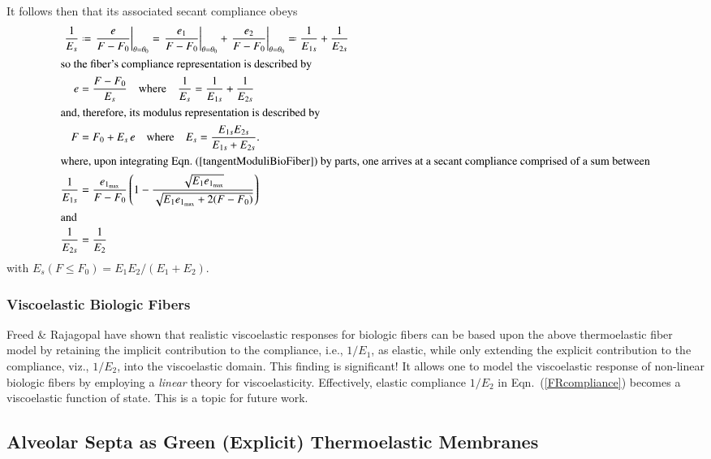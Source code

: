 It follows then that its associated secant compliance obeys
\begin{subequations}
    \label{secantFiberModulus}
    \begin{align}
    \frac{1}{E_s} & \defeq 
    \left. \frac{e}{F-F_0} \right|_{\theta = \theta_0} = 
    \left. \frac{e_1}{F-F_0} \right|_{\theta = \theta_0} + 
    \left. \frac{e_2}{F-F_0} \right|_{\theta = \theta_0} \eqdef 
    \frac{1}{E_{1s}} + \frac{1}{E_{2s}} \\
    \intertext{so the fiber's compliance representation is described by}
    e & = \frac{F - F_0}{E_s} 
    \quad \text{where} \quad
    \frac{1}{E_s} = \frac{1}{E_{1s}} + \frac{1}{E_{2s}} \\
    \intertext{and, therefore, its modulus representation is described by}
    F & = F_0 + E_s \, e
    \quad \text{where} \quad
    E_s = \frac{E_{1s} E_{2s}}{E_{1s} + E_{2s}} . \\
    \intertext{where, upon integrating Eqn.~(\ref{tangentModuliBioFiber}) by parts, one arrives at a secant compliance comprised of a sum between}
    \frac{1}{E_{1s}} & = \frac{e_{1_{\max}}}{F-F_0} \left( 1 - 
    \frac{\sqrt{E_1 e_{1_{\max}}}}
    {\sqrt{E_1 e_{1_{\max}} + 2(F-F_0)}} \right)  \\
    \intertext{and}
    \frac{1}{E_{2s}} & = \frac{1}{E_2}
    \end{align}
\end{subequations}
with $E_s(F \! \leq \! F_0) = E_1 E_2 / (E_1 + E_2)$.

\subsubsection{Viscoelastic Biologic Fibers}

Freed \& Rajagopal \cite{FreedRajagopal16a} have shown that realistic visco\-elastic responses for biologic fibers can be based upon the above thermo\-elastic fiber model by retaining the implicit contribution to the compliance, i.e., $1/E_1$, as elastic, while only extending the explicit contribution to the compliance, viz., $1/E_2$, into the visco\-elastic domain.  This finding is significant!  It allows one to model the visco\-elastic response of non-linear biologic fibers by employing a \textit{linear\/} theory for visco\-elasticity.  Effectively, elastic compliance $1/E_2$ in Eqn.~(\ref{FRcompliance}) becomes a visco\-elastic function of state.  This is a topic for future work.

\subsection{Alveolar Septa as Green (Explicit) Thermoelastic Membranes}

